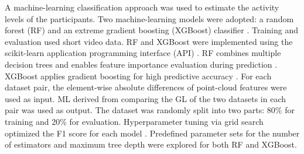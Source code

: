 %
A machine-learning classification approach was used to estimate the activity levels of the participants.
%
Two machine-learning models were adopted: a random forest (RF) and an extreme gradient boosting (XGBoost) classifier \cite{ho1995random, 10.1145/2939672.2939785}.
%
Training and evaluation used short video data.
RF and XGBoost were implemented using the scikit-learn application programming interface (API) \cite{pedregosa2011scikit,buitinck2013api}.
RF combines multiple decision trees and enables feature importance evaluation during prediction \cite{ho1995random}.
XGBoost applies gradient boosting for high predictive accuracy \cite{10.1145/2939672.2939785}.
%
For each dataset pair, the element-wise absolute differences of point-cloud features were used as input.
  ML derived from comparing the GL of the two datasets in each pair was used as output.
%
The dataset was randomly split into two parts: 80\% for training and 20\% for evaluation.
%
Hyperparameter tuning via grid search optimized the F1 score for each model \cite{10.5555/2188385.2188395}.
Predefined parameter sets for the number of estimators and maximum tree depth were explored for both RF and XGBoost.
